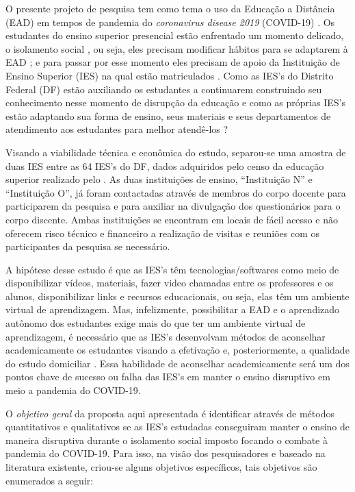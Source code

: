 \documentclass[
	arial,
	12pt,				%
	openright,			%
	oneside,
	a4paper,			%
	chapter=TITLE,		%
	english,			%
	french,				%
	spanish,			%
	brazil,				%
	]{abntex2}
\begin{document}
O presente projeto de pesquisa tem como tema o uso da Educação a Distância (EAD) em tempos de pandemia  do \textit{coronavirus disease 2019} (COVID-19) . Os estudantes do ensino superior  presencial 
estão enfrentado um momento delicado, o isolamento social , ou seja, eles precisam modificar hábitos para se adaptarem à EAD \cite{zhou2020school}; e para passar por esse momento eles precisam de apoio da Instituição de 
Ensino Superior (IES) na qual estão matriculados \cite{xie2020autonomous}. Como as IES's do Distrito Federal (DF) estão auxiliando os estudantes a continuarem construindo seu conhecimento nesse 
momento de disrupção da educação e como as próprias IES's estão adaptando sua forma de ensino, seus materiais e seus departamentos de atendimento aos estudantes para melhor atendê-los ?

Visando a viabilidade técnica e econômica do estudo, separou-se uma amostra de duas IES entre as 64 IES's do DF, dados adquiridos pelo censo da educação superior  realizado pelo . As duas 
instituições de ensino, ``Instituição N'' e ``Instituição O'', já foram contactadas através de membros do corpo docente para participarem da pesquisa e para auxiliar na divulgação dos questionários para o corpo discente. 
Ambas instituições se encontram em locais de fácil acesso e não oferecem risco técnico e financeiro a realização de visitas e reuniões com os participantes da pesquisa se necessário.  

A hipótese desse estudo é que as IES's têm tecnologias/softwares como meio de disponibilizar vídeos, materiais, fazer video chamadas entre os professores e os alunos, disponibilizar links e recursos educacionais,
ou seja, elas têm um ambiente virtual de aprendizagem. Mas, infelizmente, possibilitar a EAD e o aprendizado autônomo dos estudantes exige mais do que ter um ambiente virtual de aprendizagem, é necessário que as IES's 
desenvolvam métodos de aconselhar academicamente os estudantes visando a efetivação e, posteriormente, a qualidade do estudo domiciliar \cite{xie2020autonomous}. Essa habilidade de aconselhar academicamente
 será um dos pontos chave de sucesso ou falha das IES's em manter o ensino disruptivo  em meio a pandemia  do COVID-19. 

O \textit{objetivo geral} da proposta aqui apresentada é identificar através de métodos quantitativos e qualitativos   se as IES's estudadas conseguiram manter o ensino de maneira disruptiva durante o isolamento social imposto focando o combate à pandemia  do COVID-19. Para isso, na visão dos pesquisadores e baseado na literatura existente, criou-se alguns objetivos específicos, tais objetivos são enumerados a seguir:
\end{document}
